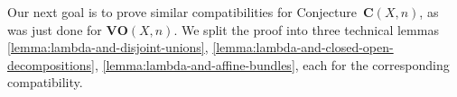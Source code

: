 \documentclass[10pt,a4paper,oneside]{article}
\DeclareMathOperator{\Hom}{Hom}
\DeclareMathOperator{\ord}{ord}
\DeclareMathOperator{\rk}{rk}
\newcommand{\CC}{\mathbb{C}}
\newcommand{\RR}{\mathbb{R}}
\newcommand{\ZZ}{\mathbb{Z}}
\newcommand{\et}{\text{\it \'{e}t}}
\newcommand{\Wc}{\text{\it W,c}}
\newcommand{\dfn}{\mathrel{\mathop:}=}
\newcommand{\RHom}{R\!\Hom}
\theoremstyle{myplain}
\theoremstyle{mydefinition}
\newtheorem{remark}[theorem]{Remark}
\numberwithin{equation}{section}
\begin{document}


Our next goal is to prove similar compatibilities for
Conjecture~$\mathbf{C} (X,n)$, as was just done for $\mathbf{VO} (X,n)$.
We split the proof into three technical lemmas
\ref{lemma:lambda-and-disjoint-unions},
\ref{lemma:lambda-and-closed-open-decompositions},
\ref{lemma:lambda-and-affine-bundles}, each for the corresponding compatibility.
\end{document}

